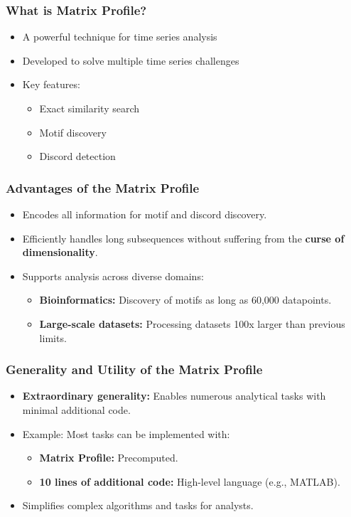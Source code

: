 \begin{frame}[fragile]\frametitle{What is Matrix Profile?}
    \begin{itemize}
        \item A powerful technique for time series analysis
        \item Developed to solve multiple time series challenges
        \item Key features:
            \begin{itemize}
                \item Exact similarity search
                \item Motif discovery
                \item Discord detection
            \end{itemize}
    \end{itemize}
\end{frame}

\begin{frame}[fragile]\frametitle{Advantages of the Matrix Profile}
    \begin{itemize}
        \item Encodes all information for motif and discord discovery.
        \item Efficiently handles long subsequences without suffering from the \textbf{curse of dimensionality}.
        \item Supports analysis across diverse domains:
            \begin{itemize}
                \item \textbf{Bioinformatics:} Discovery of motifs as long as 60,000 datapoints.
                \item \textbf{Large-scale datasets:} Processing datasets 100x larger than previous limits.
            \end{itemize}
    \end{itemize}
\end{frame}

\begin{frame}[fragile]\frametitle{Generality and Utility of the Matrix Profile}
    \begin{itemize}
        \item \textbf{Extraordinary generality:} Enables numerous analytical tasks with minimal additional code.
        \item Example: Most tasks can be implemented with:
            \begin{itemize}
                \item \textbf{Matrix Profile:} Precomputed.
                \item \textbf{10 lines of additional code:} High-level language (e.g., MATLAB).
            \end{itemize}
        \item Simplifies complex algorithms and tasks for analysts.
    \end{itemize}
\end{frame}

